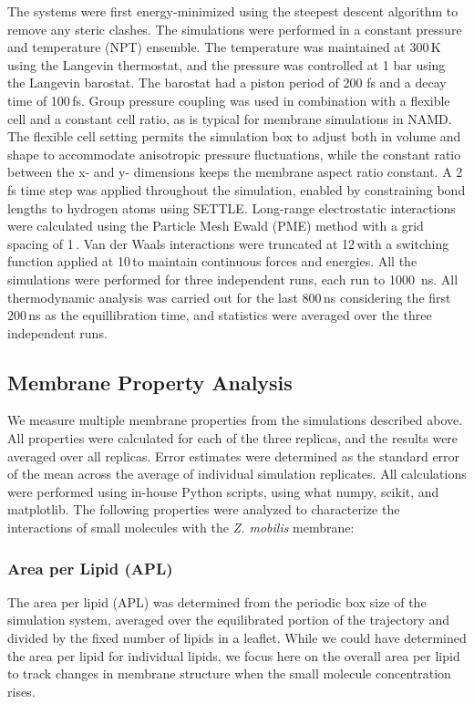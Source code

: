 The systems were first energy-minimized using the steepest descent algorithm to remove any steric clashes.
The simulations were performed in a constant pressure and temperature (NPT) ensemble. 
The temperature was maintained at 300\,K using the Langevin thermostat\cite{Dunweg2003}, and the pressure was controlled at 1 bar using the Langevin barostat\cite{Feller1995}.
The barostat had a piston period of 200 fs and a decay time of 100\,fs.
Group pressure coupling was used in combination with a flexible cell and a constant cell ratio, as is typical for membrane simulations in NAMD.
The flexible cell setting permits the simulation box to adjust both in volume and shape to accommodate anisotropic pressure fluctuations, while the constant ratio between the x- and y- dimensions keeps the membrane aspect ratio constant.
A 2\,fs time step was applied throughout the simulation, enabled by constraining bond lengths to hydrogen atoms using SETTLE\cite{Miyamoto1992}.
Long-range electrostatic interactions were calculated using the Particle Mesh Ewald (PME) method \cite{Essmann1995} with a grid spacing of 1\,\Angs.
Van der Waals interactions were truncated at 12\,\Angs with a switching function applied at 10\,\Angs to maintain continuous forces and energies.
All the simulations were performed for three independent runs, each run to 1000~ns.
All thermodynamic analysis was carried out for the last 800\,ns considering the first 200\,ns as the equillibration time, and statistics were averaged over the three independent runs.

\subsection*{Membrane Property Analysis}
We measure multiple membrane properties from the simulations described above.
All properties were calculated for each of the three replicas, and the results were averaged over all replicas.
Error estimates were determined as the standard error of the mean across the average of individual simulation replicates.
All calculations were performed using in-house Python scripts, using what numpy\cite{vanderWalt2011}, scikit\cite{JMLR:v12:pedregosa11a}, and matplotlib\cite{Hunter2007}.
The following properties were analyzed to characterize the interactions of small molecules with the \textit{Z. mobilis} membrane:

\subsubsection*{Area per Lipid (APL)}
The area per lipid (APL) was determined from the periodic box size of the simulation system, averaged over the equilibrated portion of the trajectory and divided by the fixed number of lipids in a leaflet.
While we could have determined the area per lipid for individual lipids, we focus here on the overall area per lipid to track changes in membrane structure when the small molecule concentration rises.


